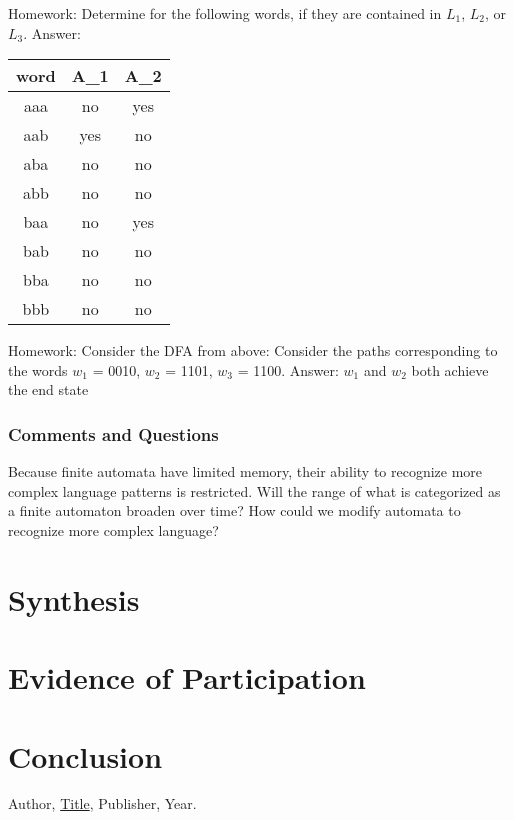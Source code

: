 \documentclass{article}
\theoremstyle{theorem}
\theoremstyle{definition}
\theoremstyle{remark}
\begin{document}
Homework: Determine for the following words, if they are contained in $L_{1}$, $L_{2}$, or $L_{3}$.\newline
Answer:
\begin{table}[h!]
  \centering
  \begin{tabular}{||c c c||} 
   \hline
   word & A\_1 & A\_2 \\ [0.5ex] 
   \hline\hline
   aaa & no  & yes  \\ 
   aab & yes  & no  \\
   aba & no  & no  \\
   abb & no  & no  \\
   baa & no  & yes \\ 
   bab & no & no \\
   bba & no & no \\
   bbb & no & no \\ [1ex] 
   \hline
  \end{tabular}
  \end{table}

Homework: Consider the DFA from above: Consider the paths corresponding to the words $w_{1}$ = 0010, $w_{2}$ = 1101, $w_{3}$ = 1100.\newline
Answer: $w_{1}$ and $w_{2}$ both achieve the end state

\subsubsection*{Comments and Questions}
Because finite automata have limited memory, their ability to recognize more complex language patterns is restricted. Will the range of what is categorized as a finite automaton broaden over time? How could we modify automata to recognize more complex language?

\section{Synthesis}

\section{Evidence of Participation}

\section{Conclusion}\label{conclusion}

\begin{thebibliography}{99}
 Author, \href{https://en.wikipedia.org/wiki/LaTeX}{Title}, Publisher, Year.
\end{thebibliography}
\end{document}
